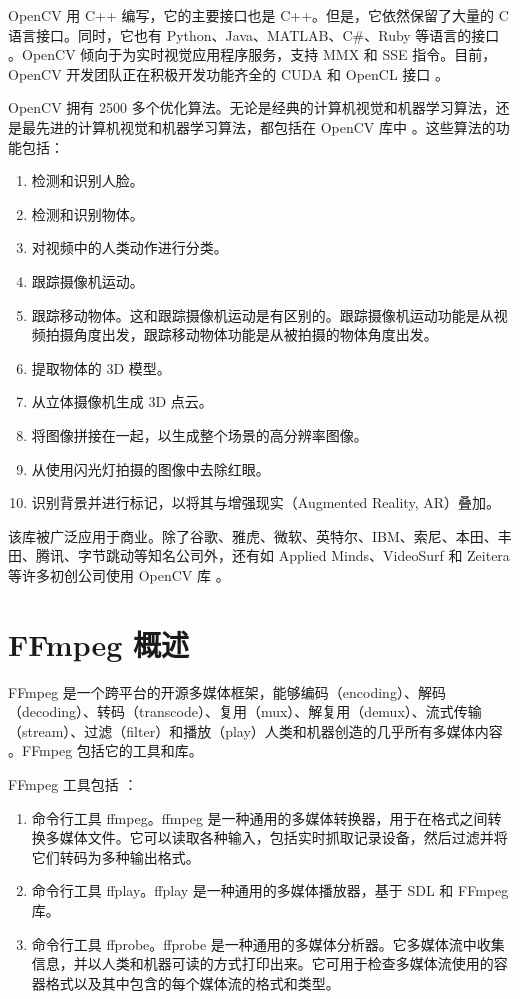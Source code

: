 OpenCV 用 C++ 编写，它的主要接口也是 C++。但是，它依然保留了大量的 C 语言接口。同时，它也有 Python、Java、MATLAB、C\#、Ruby 等语言的接口 \cite{wiki_opencv}。OpenCV 倾向于为实时视觉应用程序服务，支持 MMX 和 SSE 指令。目前，OpenCV 开发团队正在积极开发功能齐全的 CUDA 和 OpenCL 接口 \cite{opencv_about}。

OpenCV 拥有 2500 多个优化算法。无论是经典的计算机视觉和机器学习算法，还是最先进的计算机视觉和机器学习算法，都包括在 OpenCV 库中 \cite{opencv_about}。这些算法的功能包括：

\begin{enumerate}
    \item 检测和识别人脸。
    \item 检测和识别物体。
    \item 对视频中的人类动作进行分类。
    \item 跟踪摄像机运动。
    \item 跟踪移动物体。这和跟踪摄像机运动是有区别的。跟踪摄像机运动功能是从视频拍摄角度出发，跟踪移动物体功能是从被拍摄的物体角度出发。
    \item 提取物体的 3D 模型。
    \item 从立体摄像机生成 3D 点云。
    \item 将图像拼接在一起，以生成整个场景的高分辨率图像。
    \item 从使用闪光灯拍摄的图像中去除红眼。
    \item 识别背景并进行标记，以将其与增强现实（Augmented Reality, AR）叠加。
\end{enumerate}

该库被广泛应用于商业。除了谷歌、雅虎、微软、英特尔、IBM、索尼、本田、丰田、腾讯、字节跳动等知名公司外，还有如 Applied Minds、VideoSurf 和 Zeitera 等许多初创公司使用 OpenCV 库 \cite{opencv_about}。

\section{FFmpeg 概述}

FFmpeg 是一个跨平台的开源多媒体框架，能够编码（encoding）、解码（decoding）、转码（transcode）、复用（mux）、解复用（demux）、流式传输（stream）、过滤（filter）和播放（play）人类和机器创造的几乎所有多媒体内容 \cite{ffmpeg_about}。FFmpeg 包括它的工具和库。

FFmpeg 工具包括 \cite{ffmpeg_doc}：

\begin{enumerate}
    \item 命令行工具 ffmpeg。ffmpeg 是一种通用的多媒体转换器，用于在格式之间转换多媒体文件。它可以读取各种输入，包括实时抓取记录设备，然后过滤并将它们转码为多种输出格式。
    \item 命令行工具 ffplay。ffplay 是一种通用的多媒体播放器，基于 SDL 和 FFmpeg 库。
    \item 命令行工具 ffprobe。ffprobe 是一种通用的多媒体分析器。它多媒体流中收集信息，并以人类和机器可读的方式打印出来。它可用于检查多媒体流使用的容器格式以及其中包含的每个媒体流的格式和类型。
\end{enumerate}

